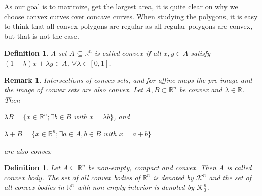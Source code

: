 \documentclass[a4paper]{book}
\newtheorem{remark}[theorem]{Remark}%
\newtheorem{definition}[theorem]{Definition}%
\numberwithin{theorem}{section}%
\begin{document}
As our goal is to maximize, get the largest area, it is quite clear on why we choose convex curves over concave curves. When studying the polygons, it is easy to think that all convex polygons are regular as all regular polygons are convex, but that is not the case.
\newline

\begin{definition}
	A set $A\subseteq\mathbb{R}^n$ is called $convex$ if all $x,y\in A$ satisfy $(1-\lambda)x+\lambda y\in A$, $\forall\lambda\in[0,1]$.
\end{definition}

\begin{remark}
	Intersections of convex sets, and for affine maps the pre-image and the image of convex sets are also convex. Let $A, B \subset\mathbb{R}^n$ be convex and $\lambda\in\mathbb{R}$. Then
	\begin{center}
		$\lambda B=\{x\in\mathbb{R}^n;\exists b\in B$ with $x=\lambda\dot b\}$, and
	
		$\lambda+B=\{x\in\mathbb{R}^n;\exists a\in A, b\in B$ with $x=a+b\}$
	\end{center}
	are also convex
\end{remark}

\begin{definition}
	Let $A\subseteq\mathbb{R}^n$ be non-empty, compact and convex. Then $A$ is called $convex$ $body$. The set of all convex bodies of $\mathbb{R}^n$ is denoted by $\mathscr{K}^n$ and the set of all convex bodies in $\mathbb{R}^n$ with non-empty interior is denoted by $\mathscr{K}_{0}^{n}$.
\end{definition}
\end{document}
